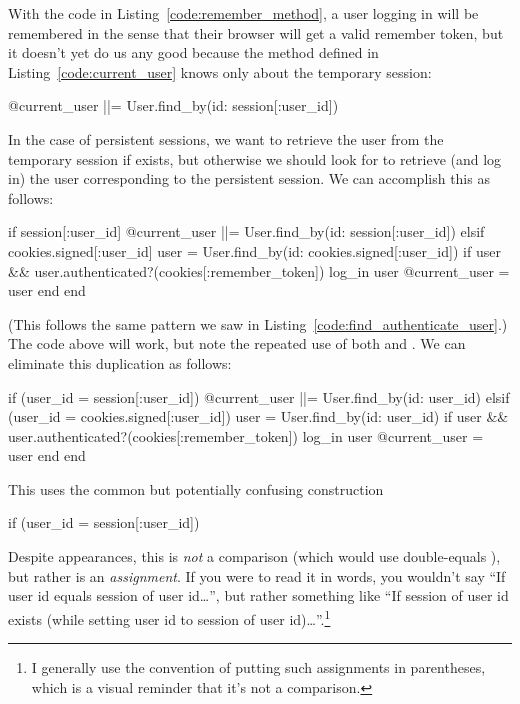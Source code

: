 With the code in Listing~\ref{code:remember_method}, a user logging in will be remembered in the sense that their browser will get a valid remember token, but it doesn't yet do us any good because the  method defined in Listing~\ref{code:current_user} knows only about the temporary session:

\begin{code}
@current_user ||= User.find_by(id: session[:user_id])
\end{code}

\noindent In the case of persistent sessions, we want to retrieve the user from the temporary session if  exists, but otherwise we should look for  to retrieve (and log in) the user corresponding to the persistent session. We can accomplish this as follows:

\begin{code}
if session[:user_id]
  @current_user ||= User.find_by(id: session[:user_id])
elsif cookies.signed[:user_id]
  user = User.find_by(id: cookies.signed[:user_id])
  if user && user.authenticated?(cookies[:remember_token])
    log_in user
    @current_user = user
  end
end
\end{code}

\noindent (This follows the same  pattern we saw in Listing~\ref{code:find_authenticate_user}.) The code above will work, but note the repeated use of both  and . We can eliminate this duplication as follows:

\begin{code}
if (user_id = session[:user_id])
  @current_user ||= User.find_by(id: user_id)
elsif (user_id = cookies.signed[:user_id])
  user = User.find_by(id: user_id)
  if user && user.authenticated?(cookies[:remember_token])
    log_in user
    @current_user = user
  end
end
\end{code}

\noindent This uses the common but potentially confusing construction

\begin{code}
if (user_id = session[:user_id])
\end{code}

\noindent Despite appearances, this is \emph{not} a comparison (which would use double-equals \kode{==}), but rather is an \emph{assignment}. If you were to read it in words, you wouldn't say ``If user id equals session of user id\ldots'', but rather something like ``If session of user id exists (while setting user id to session of user id)\ldots''.\footnote{I generally use the convention of putting such assignments in parentheses, which is a visual reminder that it's not a comparison.}

